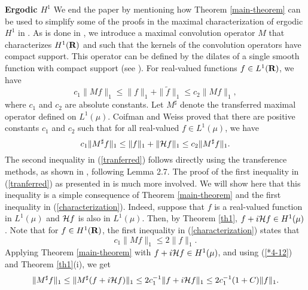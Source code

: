 {\bf Ergodic $H^1$}  We end the paper by mentioning how Theorem 
\ref{main-theorem} 
can be used to simplify some of the proofs in the 
maximal characterization of ergodic $H^1$ in \cite{cw2}.
As is done in \cite{cw2}, we introduce a
 maximal convolution operator $M$ that
characterizes $H^1(\R)$ and such that the kernels of 
the convolution operators have compact support.  
This operator can be defined by the dilates 
of a single smooth function with compact support
(see \cite[Section 1]{cw2}).  For real-valued functions
$f\in L^1(\R)$, we have
\begin{equation}
c_1 \|Mf\|_1\leq \|f\|_1 +\|\widetilde{f}\|_1\leq c_2\|Mf\|_1,
\label{characterization}
\end{equation}
where $c_1$ and $c_2$ are absolute constants.
Let $M^\sharp$ denote the transferred 
maximal operator defined on $L^1(\mu)$.
Coifman and Weiss \cite{cw2} proved that there are
positive constants $c_1$ and $c_2$ such that
for all real-valued $f\in L^1(\mu)$, we have
\begin{equation}
c_1 \|M^\sharp f\|_1\leq \|f\|_1 +\|{\cal H} f\|_1\leq 
c_2\|M^\sharp f\|_1.
\label{tranferred}
\end{equation}
The second inequality in (\ref{tranferred}) follows 
directly using the transference methods, as shown in
\cite{cw2}, following Lemma 2.7.  
The proof of the first inequality in (\ref{tranferred})
as presented in \cite{cw2} is much more involved.
We will show here that this inequality is a 
simple consequence of Theorem \ref{main-theorem}
and the first inequality in (\ref{characterization}).  
Indeed, suppose that
$f$ is a real-valued function in 
$L^1(\mu)$ and ${\cal H} f$ is also in $L^1(\mu)$.  Then,
by Theorem \ref{th1}, $f + i {\cal H} f\in H^1(\mu)$.
Note that for $f\in H^1(\R)$, 
the first inequality in (\ref{characterization})
states that 
\begin{equation}
c_1\|Mf\|_1\leq 2 \|f\|_1.
\label{*4-12}
\end{equation}
Applying
Theorem \ref{main-theorem} with
$f+i{\cal H} f\in H^1(\mu)$, and using
(\ref{*4-12}) and Theorem \ref{th1}(i), we get
$$
\|M^\sharp f\|_1
		\leq
\|M^\sharp( f+i{\cal H} f)\|_1	
		\leq
 2c_1^{-1}\|f + i {\cal H} f\|_1	
		\leq
 2c_1^{-1}( 1+C) \|f\|_1.$$

